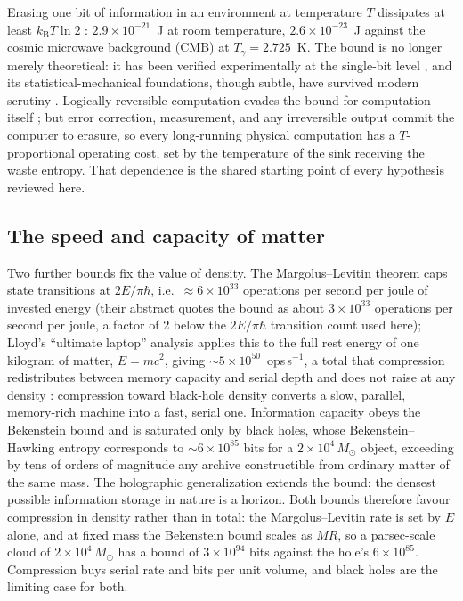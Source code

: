 \documentclass[11pt]{article}
\newcommand{\msun}{\ensuremath{M_\odot}}
\newcommand{\kb}{\ensuremath{k_{\mathrm{B}}}}
\begin{document}
Erasing one bit of information in an environment at temperature $T$ dissipates at least $\kb T \ln 2$ \citep{Landauer1961}: $2.9\times10^{-21}$~J at room temperature, $2.6\times10^{-23}$~J against the cosmic microwave background (CMB) at $T_{\gamma} = 2.725$~K. The bound is no longer merely theoretical: it has been verified experimentally at the single-bit level \citep{Berut2012}, and its statistical-mechanical foundations, though subtle, have survived modern scrutiny \citep{Parrondo2015,Wolpert2019}. Logically reversible computation evades the bound for computation itself \citep{Bennett1973,FredkinToffoli1982,Bennett1982,Frank2002,Frank2017}; but error correction, measurement, and any irreversible output commit the computer to erasure, so every long-running physical computation has a $T$-proportional operating cost, set by the temperature of the sink receiving the waste entropy. That dependence is the shared starting point of every hypothesis reviewed here.

\subsection{The speed and capacity of matter}

Two further bounds fix the value of density. The Margolus--Levitin theorem caps state transitions at $2E/\pi\hbar$, i.e.\ $\approx 6\times10^{33}$ operations per second per joule of invested energy \citep{MargolusLevitin1998} (their abstract quotes the bound as about $3\times10^{33}$ operations per second per joule, a factor of 2 below the $2E/\pi\hbar$ transition count used here); Lloyd's ``ultimate laptop'' analysis applies this to the full rest energy of one kilogram of matter, $E = mc^{2}$, giving $\sim 5\times10^{50}$~ops\,s$^{-1}$, a total that compression redistributes between memory capacity and serial depth and does not raise at any density \citep{Lloyd2000}: compression toward black-hole density converts a slow, parallel, memory-rich machine into a fast, serial one. Information capacity obeys the Bekenstein bound \citep{Bekenstein1981} and is saturated only by black holes, whose Bekenstein--Hawking entropy \citep{Bekenstein1973,Hawking1975} corresponds to $\sim 6\times10^{85}$ bits for a $2\times10^{4}\,\msun$ object, exceeding by tens of orders of magnitude any archive constructible from ordinary matter of the same mass. The holographic generalization \citep{Bousso2002} extends the bound: the densest possible information storage in nature is a horizon. Both bounds therefore favour compression in density rather than in total: the Margolus--Levitin rate is set by $E$ alone, and at fixed mass the Bekenstein bound scales as $MR$, so a parsec-scale cloud of $2\times10^{4}\,\msun$ has a bound of $3\times10^{94}$ bits against the hole's $6\times10^{85}$. Compression buys serial rate and bits per unit volume, and black holes are the limiting case for both.
\end{document}
